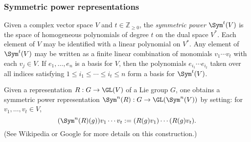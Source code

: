 \documentclass[reqno]{amsart} 
\begin{document}
\subsubsection{Symmetric power representations\label{sec:constructing-sym-power}}
\label{sec:org4d627e9}
Given a complex vector space $V$
and $t \in \mathbb{Z}_{\geq 0}$,
the \emph{symmetric power} $\Sym^t(V)$
is the space of homogeneous polynomials of degree $t$
on the dual space $V^*$.
Each element of $V$ may be identified
with a linear polynomial on $V^*$.
Any element of $\Sym^t(V)$ may be written
as a finite linear combination
of monomials $v_1 \dotsb v_t$ with each $v_j \in V$.
If $e_1,\dotsc,e_n$ is a basis for $V$,
then the polynomials
$e_{i_1} \dotsb e_{i_t}$ taken over all indices satisfying
$1 \leq i_1 \leq \dotsb \leq i_t \leq n$
form a basis for $\Sym^t(V)$.

Given a representation $R : G \rightarrow \GL(V)$
of a Lie group $G$,
one obtains a symmetric power representation
$\Sym^n(R) : G \rightarrow \GL(\Sym^n(V))$
by setting: for $v_1,\dotsc,v_t \in V$,
\begin{equation*}
  (\Sym^n(R)(g)) v_1 \dotsb v_t
  := (R(g) v_1) \dotsb (R(g) v_t).
\end{equation*}
(See Wikipedia or Google for more details on this construction.)
\end{document}
